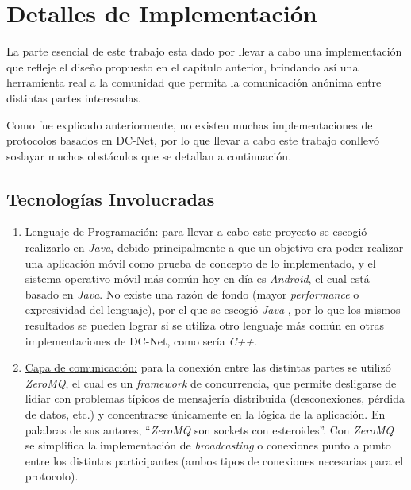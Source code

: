 \chapter{Detalles de Implementación}

La parte esencial de este trabajo esta dado por llevar a cabo una 
implementación que refleje el diseño propuesto en el capitulo anterior, 
brindando así una herramienta real a la comunidad que permita la comunicación 
anónima entre distintas partes interesadas.

Como fue explicado anteriormente, no existen muchas implementaciones de 
protocolos basados en DC-Net, por lo que llevar a cabo este trabajo conllevó 
soslayar muchos obstáculos que se detallan a continuación.

\section{Tecnologías Involucradas}

\begin{enumerate}
    \item \underline{Lenguaje de Programación:} para llevar a cabo este 
    proyecto se escogió realizarlo en \emph{Java}, debido principalmente a que 
    un objetivo era poder realizar una aplicación móvil como prueba de 
    concepto de lo implementado, y el sistema operativo móvil más común hoy en 
    día es \emph{Android}, el 
    cual está basado en \emph{Java}. No existe una razón de fondo (mayor \emph{
    performance} o expresividad del lenguaje), por el que se escogió \emph{Java
    }, por lo que los mismos resultados se pueden lograr si se utiliza otro 
    lenguaje más común en otras implementaciones de DC-Net, como sería \emph{
    C++}.

    \item \underline{Capa de comunicación:} para la conexión entre las 
    distintas partes se utilizó \emph{ZeroMQ}, el cual es un \emph{framework} 
    de concurrencia, que permite desligarse de lidiar con problemas típicos de 
    mensajería distribuida (desconexiones, pérdida de datos, etc.) y 
    concentrarse únicamente en la lógica de la aplicación. En palabras de sus 
    autores, ``\emph{ZeroMQ} son sockets con esteroides''. Con \emph{ZeroMQ} 
    se simplifica la implementación de \emph{broadcasting} o conexiones punto 
    a punto entre los distintos participantes (ambos tipos de conexiones 
    necesarias para el protocolo).
\end{enumerate}

